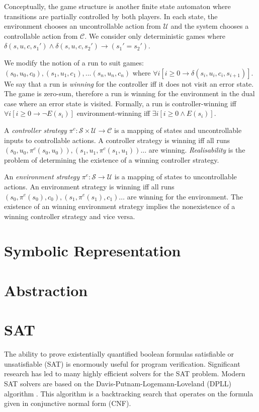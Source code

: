 Conceptually, the game structure is another finite state automaton where transitions are partially controlled by both players. In each state, the environment chooses an uncontrollable action from $\mathcal{U}$ and the system chooses a controllable action from $\mathcal{C}$. We consider only deterministic games where $\delta(s, u, c, s_1') \land \delta(s, u, c, s_2') \to (s_1' = s_2')$. 

We modify the notion of a run to suit games: $(s_0, u_0, c_0), (s_1, u_1, c_1), ... (s_n, u_n, c_n)$ where $\forall i [i \geq 0 \to \delta(s_i, u_i, c_i, s_{i+1})]$. We say that a run is \emph{winning} for the controller iff it does not visit an error state. The game is zero-sum, therefore a run is winning for the environment in the dual case where an error state is visited. Formally, a run is controller-winning iff $\forall i [i \geq 0 \to \lnot E(s_i)]$ environment-winning iff $\exists i [i \geq 0 \land E(s_i)]$.

A \emph{controller strategy} $\pi^c : \mathcal{S} \times \mathcal{U} \to \mathcal{C}$ 
is a mapping of states and uncontrollable inputs to controllable actions. A controller strategy is winning
iff all runs $(s_0, u_0, \pi^c(s_0, u_0)), (s_1, u_1, \pi^c(s_1, u_1)) \dots$ are winning.
\emph{Realisability} is the problem of determining the existence of a winning controller strategy.

An \emph{environment strategy} $\pi^e : \mathcal{S} \to \mathcal{U}$ is a mapping of states to
uncontrollable actions. An environment strategy is winning
iff all runs $(s_0, \pi^e(s_0), c_0), (s_1, \pi^e(s_1), c_1)
\dots$ are winning for the environment. The existence of an winning environment strategy implies the nonexistence of a winning controller strategy and vice versa.

\section{Symbolic Representation}

\section{Abstraction}

\section{SAT}

The ability to prove existentially quantified boolean formulas satisfiable or
unsatisfiable (SAT) is enormously useful for program verification. Significant
research has led to many highly efficient solvers for the SAT problem. Modern
SAT solvers are based on the Davis-Putnam-Logemann-Loveland (DPLL) algorithm
\cite{Davis60, Davis62}. This algorithm is a backtracking search that operates
on the formula given in conjunctive normal form (CNF).

